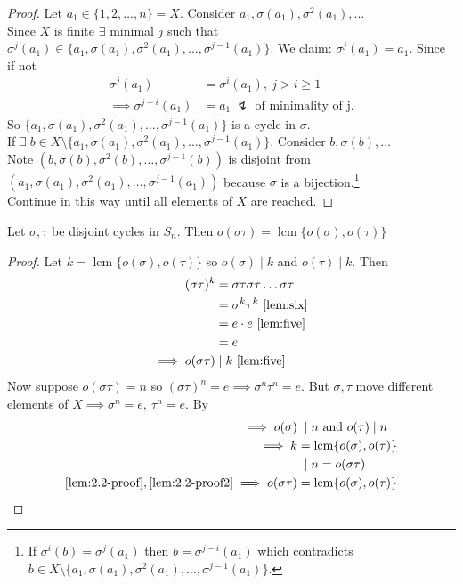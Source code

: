 \begin{proof}
Let \(a_1 \in \{ 1, 2, \ldots, n \} = X\).
Consider \(a_1, \sigma(a_1), \sigma^2(a_1), \ldots\)\\
Since \(X\) is finite \(\exists\) minimal \(j\) such that \(\sigma^j(a_1) \in \{ a_1, \sigma(a_1), \sigma^2(a_1), \ldots, \sigma^{j-1}(a_1) \}\).
We claim: \(\sigma^j(a_1) = a_1\).
Since if not \begin{align*}
    \sigma^j(a_1) &= \sigma^i(a_1),\ j > i \geq 1 \\
    \implies \sigma^{j - i}(a_1) &= a_1 \ ↯ \text{ of minimality of j.}
\end{align*}
So \(\{ a_1, \sigma(a_1), \sigma^2(a_1), \ldots, \sigma^{j-1}(a_1) \}\) is a cycle in \(\sigma\).\\
If \(\exists \; b \in X \setminus \{ a_1, \sigma(a_1), \sigma^2(a_1), \ldots, \sigma^{j-1}(a_1) \}\).
Consider \(b, \sigma(b), \ldots\)\\
Note \(\left(b, \sigma(b), \sigma^2(b), \ldots, \sigma^{j-1}(b) \right)\) is disjoint from \(\left( a_1, \sigma(a_1), \sigma^2(a_1), \ldots, \sigma^{j-1}(a_1) \right)\) because \(\sigma\) is a bijection.\footnote{If \(\sigma^i(b) = \sigma^j(a_1)\) then \(b = \sigma^{j - i}(a_1)\) which contradicts \(b \in X \setminus \{ a_1, \sigma(a_1), \sigma^2(a_1), \ldots, \sigma^{j-1}(a_1) \}\).}\\
Continue in this way until all elements of \(X\) are reached.
\end{proof}

\begin{lemma}
Let \(\sigma, \tau\) be disjoint cycles in \(S_n\).
Then \(o(\sigma \tau) = \operatorname{lcm} \{ o(\sigma), o(\tau) \}\)
\end{lemma}

\begin{proof}
Let \(k = \operatorname{lcm} \{ o(\sigma), o(\tau) \}\) so \(o(\sigma) \mid k\) and \(o(\tau) \mid k\).
Then \begin{align}
    (\sigma \tau)^k &= \sigma \tau \sigma \tau \ldots \sigma \tau \notag\\
    &= \sigma^k \tau^k \ \Cref{lem:six} \notag \\
    &= e \cdot e \ \Cref{lem:five} \notag\\
    &= e \notag \\
    \implies o(\sigma \tau) &\mid k \ \Cref{lem:five} \label{lem:2.2-proof}
\end{align}
Now suppose \(o(\sigma \tau) = n\) so \((\sigma \tau)^n = e \implies \sigma^n \tau^n = e\).
But \(\sigma, \tau\) move different elements of \(X \implies \sigma^n = e,\ \tau^n = e\).
By 
\begin{align}
    \implies o(\sigma) &\;\mid n \text{ and } o(\tau) \mid n \notag\\
    \implies k &= \operatorname{lcm} \{ o(\sigma), o(\tau) \} \notag\\
    &\;\mid n = o(\sigma \tau) \label{lem:2.2-proof2} \\
    \cref{lem:2.2-proof}, \cref{lem:2.2-proof2} \implies o(\sigma \tau) &= \operatorname{lcm} \{ o(\sigma), o(\tau) \} \notag
\end{align}
\end{proof}

